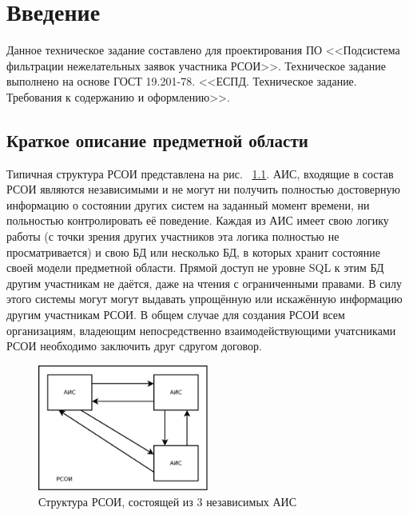 \documentclass[utf8x, 12pt]{G7-32}
\begin{document}
\mainmatter

\chapter{Введение}
Данное техническое задание составлено для проектирования ПО <<Подсистема 
фильтрации нежелательных заявок участника РСОИ>>. Техническое задание выполнено на 
основе ГОСТ 19.201-78. <<ЕСПД. Техническое задание. Требования к содержанию и 
оформлению>>.

\section{Краткое описание предметной области}
Типичная структура РСОИ представлена на рис. ~\ref{fig:rsoi}. АИС, входящие в 
состав РСОИ  являются независимыми и не могут ни получить полностью достоверную 
информацию о состоянии других систем на заданный момент времени, ни польностью 
контролировать её поведение. Каждая из АИС имеет свою логику работы (с точки 
зрения других участников эта логика полностью не просматривается) и свою БД 
или несколько БД, в которых хранит состояние своей модели предметной области. 
Прямой доступ не уровне SQL к этим БД другим участникам не даётся, даже на чтения 
с ограниченными правами. В силу этого системы могут могут выдавать упрощённую или 
искажённую информацию другим участникам РСОИ. В общем случае для создания 
РСОИ всем организациям, владеющим непосредственно взаимодействующими 
учатсниками РСОИ необходимо заключить друг сдругом договор.
\begin{figure}[ht]
        \centering
        \includegraphics[width=0.5\textwidth]{inc/dia/rpz-rsoi}
        \caption{Структура РСОИ, состоящей из 3 независимых АИС}
        \label{fig:rsoi}
\end{figure}
\end{document}
